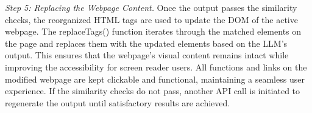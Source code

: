 \textit{Step 5: Replacing the Webpage Content.} Once the output passes the similarity checks, the reorganized HTML tags are used to update the DOM of the active webpage. The replaceTags() function iterates through the matched elements on the page and replaces them with the updated elements based on the LLM's output. This ensures that the webpage's visual content remains intact while improving the accessibility for screen reader users. All functions and links on the modified webpage are kept clickable and functional, maintaining a seamless user experience. If the similarity checks do not pass, another API call is initiated to regenerate the output until satisfactory results are achieved.